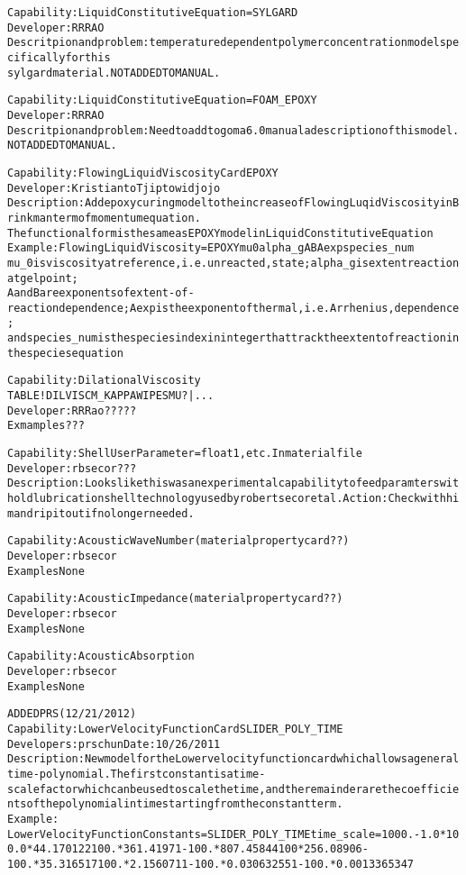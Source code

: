 \documentclass{article}
\begin{document}
\begin{alltt}
Capability:  Liquid Constitutive Equation = SYLGARD
Developer: RRRAO
Descritpion and problem: temperature dependent polymer concentration model specifically for this
sylgard material.    NOT ADDED TO MANUAL.    

Capability:  Liquid Constitutive Equation = FOAM_EPOXY
Developer: RRRAO
Descritpion and problem: Need to add to goma6.0 manual a description of this model. 
    NOT ADDED TO MANUAL.

Capability: FlowingLiquid Viscosity Card EPOXY
Developer: Kristianto Tjiptowidjojo
Description: Add epoxy curing model to the increase of FlowingLuqid Viscosity in Brinkman term of momentum equation.
The functional form is the same as EPOXY model in Liquid Constitutive Equation
Example: FlowingLiquid Viscosity = EPOXY {mu0} {alpha_g} {A} {B} {Aexp} {species_num}
mu_0 is viscosity at reference, i.e. unreacted, state; alpha_g is extent reaction at gel point;
A and B are exponents of extent-of-reaction dependence; Aexp is the exponent of thermal, i.e. Arrhenius, dependence;
and species_num is the species index in integer that track the extent of reaction in the species equation

      

Capability: Dilational Viscosity 
{TABLE ! DILVISCM_KAPPAWIPESMU? | ...}
Developer: RRRao?????
Exmamples???  

Capability: Shell User Parameter = float 1, etc.   In material file
Developer: rbsecor???
Description:  Looks like this was an experimental capability to feed paramters with old lubrication shell technology used by robert secor et al.   Action: Check with him and rip it out if no longer needed.  

Capability: Acoustic Wave Number (material property card??)
Developer: rbsecor  
Examples None

Capability: Acoustic Impedance (material property card??)
Developer: rbsecor  
Examples None

Capability: Acoustic Absorption
Developer: rbsecor  
Examples None

ADDED PRS (12/21/2012)
Capability: Lower Velocity Function Card SLIDER_POLY_TIME
Developers: prschun Date: 10/26/2011
Description: New model for the Lower velocity function card which allows a general time-polynomial.   The first constant is a time-scale factor which can be used to scale the time, and the remainder are the coefficients of the polynomial in time starting from the constant term.  
Example: 
Lower Velocity Function Constants = SLIDER_POLY_TIME   {time_scale = 1000.} {-1.0*100.0*44.170122} {100.*361.41971} {-100.*807.45844} {100*256.08906}  {-100.*35.316517} {100.*2.1560711} {-100.*0.030632551} {-100.*0.0013365347}


\end{alltt}
\end{document}
